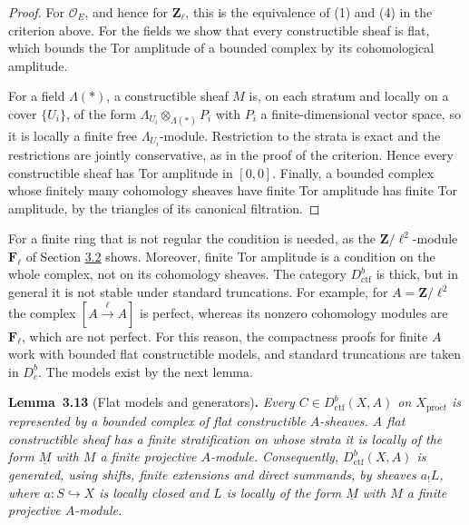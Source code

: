 \documentclass[11pt]{article}
\newenvironment{bpstatement}[2]{\par\addvspace{0.6\baselineskip}\noindent\textbf{#1}#2\textbf{.}\enspace\ignorespaces}
  {\par\addvspace{0.4\baselineskip}}
\newenvironment{bpstatementit}[2]{\begin{bpstatement}{#1}{#2}\itshape\ignorespaces}{\end{bpstatement}}
\providecommand{\Dbc}{}\renewcommand{\Dbc}{D^b_c}
\begin{document}
\begin{proof}[{Proof}]\label{bp41}%
For \(\mathcal O_E\), and hence for \(\mathbf Z_\ell\), this is the equivalence of (1) and (4) in the criterion above. For the fields we show that every constructible sheaf is flat, which bounds the Tor amplitude of a bounded complex by its cohomological amplitude.

For a field \(\Lambda(*)\), a constructible sheaf \(M\) is, on each stratum and locally on a cover \(\{U_i\}\), of the form \(\Lambda_{U_i}\otimes_{\Lambda(*)}P_i\) with \(P_i\) a finite-dimensional vector space, so it is locally a finite free \(\Lambda_{U_i}\)-module. Restriction to the strata is exact and the restrictions are jointly conservative, as in the proof of the criterion. Hence every constructible sheaf has Tor amplitude in \([0,0]\). Finally, a bounded complex whose finitely many cohomology sheaves have finite Tor amplitude has finite Tor amplitude, by the triangles of its canonical filtration.
\end{proof}

\label{bp42}%
For a finite ring that is not regular the condition is needed, as the \(\mathbf Z/\ell^2\)-module \(\mathbf F_\ell\) of Section \hyperref[bp5]{3.2} shows. Moreover, finite Tor amplitude is a condition on the whole complex, not on its cohomology sheaves. The category \(D^b_{\mathrm{ctf}}\) is thick, but in general it is not stable under standard truncations. For example, for \(A=\mathbf Z/\ell^2\) the complex \([A\xrightarrow{\ell}A]\) is perfect, whereas its nonzero cohomology modules are \(\mathbf F_\ell\), which are not perfect. For this reason, the compactness proofs for finite \(A\) work with bounded flat constructible models, and standard truncations are taken in \(\Dbc\). The models exist by the next lemma.

\label{bp43}%
\begin{bpstatementit}{Lemma~3.13}{ (Flat models and generators)}
Every \(C\in D^b_{\mathrm{ctf}}(X,A)\) on \(X_{\mathrm{pro}\acute{e}t}\) is represented by a bounded complex of flat constructible \(A\)-sheaves. A flat constructible sheaf has a finite stratification on whose strata it is locally of the form \(\underline M\) with \(M\) a finite projective \(A\)-module. Consequently, \(D^b_{\mathrm{ctf}}(X,A)\) is generated, using shifts, finite extensions and direct summands, by sheaves \(a_!L\), where \(a:S\hookrightarrow X\) is locally closed and \(L\) is locally of the form \(\underline M\) with \(M\) a finite projective \(A\)-module.
\end{bpstatementit}
\end{document}
